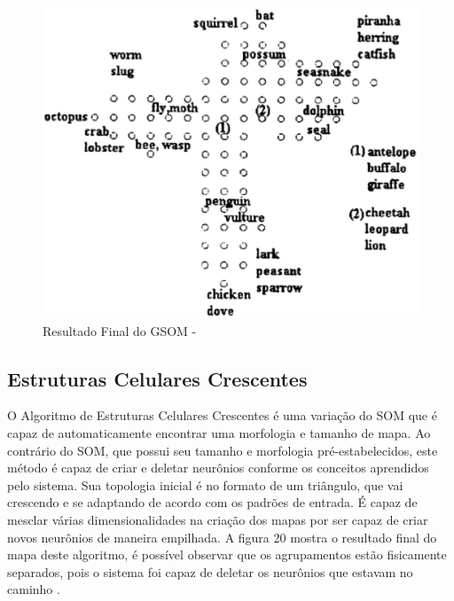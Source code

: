 \begin{figure}[!h]
\centering
\includegraphics[keepaspectratio=true,scale=0.50]
{figuras/gsom.eps}
\caption{Resultado Final do GSOM - }
\label{data_titatic}
\end{figure}

\subsection{Estruturas Celulares Crescentes}
O Algoritmo de Estruturas Celulares Crescentes é uma variação do SOM que é capaz de automaticamente encontrar uma morfologia e tamanho de mapa. Ao contrário do SOM, que possui seu tamanho e morfologia pré-estabelecidos, este método é capaz de criar e deletar neurônios conforme os conceitos aprendidos pelo sistema. Sua topologia inicial é no formato de um triângulo, que vai crescendo e se adaptando de acordo com os padrões de entrada. É capaz de mesclar várias dimensionalidades na criação dos mapas por ser capaz de criar novos neurônios de maneira empilhada. A figura 20 mostra o resultado final do mapa deste algoritmo, é possível observar que os agrupamentos estão fisicamente separados, pois o sistema foi capaz de deletar os neurônios que estavam no caminho \cite{cellsom2000}.

